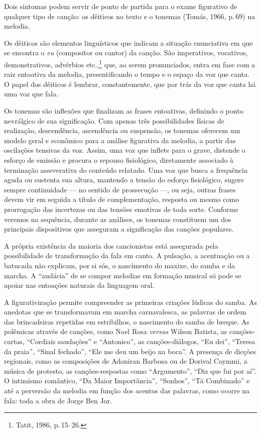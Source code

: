 Dois sintomas podem servir de ponto de partida para o exame figurativo
de qualquer tipo de canção: os dêiticos no texto e o tonemas (Tomás,
1966, p.\,69) na melodia.

Os dêiticos são elementos linguísticos que indicam a situação
enunciativa em que se encontra o \textit{eu} (compositor ou cantor) da canção.
São imperativos, vocativos, demonstrativos, advérbios etc.,\footnote{Tatit, 1986, p.\,15--26.} que, ao serem pronunciados, entra em fase com a raiz
entoativa da melodia, presentificando o tempo e o espaço da voz que
canta. O papel dos dêiticos é lembrar, constantemente, que por trás da
voz que canta há uma voz que fala.

Os tonemas são inflexões que finalizam as frases entoativas, definindo o
ponto nevrálgico de sua significação. Com apenas três possibilidades
físicas de realização, descendência, ascendência ou suspensão, os
tonemas oferecem um modelo geral e econômico para a análise figurativa
da melodia, a partir das oscilações tensivas da voz. Assim, uma voz que
inflete para o grave, distende o esforço de emissão e procura o repouso
fisiológico, diretamente associado à terminação asseverativa do conteúdo
relatado. Uma voz que busca a frequência aguda ou sustenta sua altura,
mantendo a tensão do esforço fisiológico, sugere sempre continuidade --- no
sentido de prossecução ---, ou seja, outras frases devem vir em seguida a
título de complementação, resposta ou mesmo como prorrogação das
incertezas ou das tensões emotivas de toda sorte. Conforme veremos na
sequência, durante as análises, os tonemas constituem um dos principais
dispositivos que asseguram a significação das canções populares.

A própria existência da maioria dos cancionistas está assegurada pela
possibilidade de transformação da fala em canto. A pulsação, a
acentuação ou a batucada não explicam, por si sós, o nascimento do
maxixe, do samba e da marcha. A ``audácia'' de se compor melodias em
formação musical só pode se apoiar nas entoações naturais da linguagem
oral.

A figurativização permite compreender as primeiras criações lúdicas do
samba. As anedotas que se transformavam em marcha carnavalesca, as
palavras de ordem das brincadeiras repetidas em estribilhos, o
nascimento do samba de breque. As polêmicas através de canções, como Noel
Rosa \textit{versus} Wilson Batista, as canções-cartas, ``Cordiais saudações'' e
``Antonico'', as canções-diálogos, ``Eu dei'', ``Teresa da praia'', ``Sinal fechado'',
``Ele me deu um beijo na boca''. A presença de dicções regionais, como as composições de Adoniran Barbosa ou de Dorival Caymmi, a música de
protesto, as canções-respostas como ``Argumento'', ``Diz que fui por aí''. O
intimismo romântico, ``Da Maior Importância'', ``Sonhos'', ``Tá Combinado'' e até a
perversão da melodia em função dos acentos das palavras, como ocorre na
fala: toda a obra de Jorge Ben Jor.

